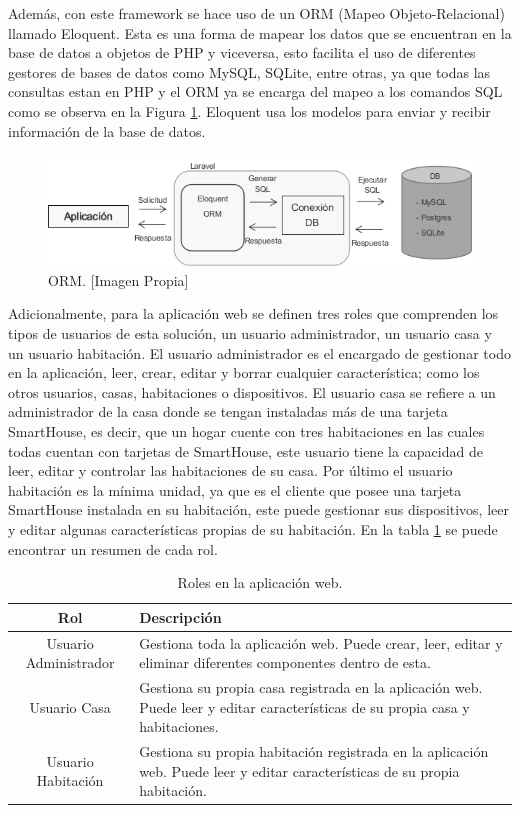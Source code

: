 Además, con este framework se hace uso de un ORM (Mapeo Objeto-Relacional) llamado Eloquent. Esta es una forma de mapear los datos que se encuentran en la base de datos a objetos de PHP y viceversa, esto facilita el uso de diferentes gestores de bases de datos como MySQL, SQLite, entre otras, ya que todas las consultas estan en PHP y el ORM ya se encarga del mapeo a los comandos SQL como se observa en la Figura \ref{fig:orm}. Eloquent usa los modelos para enviar y recibir información de la base de datos\cite{Eloq}.\\

\begin{figure}[H]
	\centering
	\caption[ORM]{ORM. [Imagen Propia]}
	\label{fig:orm}
	\includegraphics[width=0.7\linewidth]{Imagenes/ORM}
\end{figure}

Adicionalmente, para la aplicación web se definen tres roles que comprenden los tipos de usuarios de esta solución, un usuario administrador, un usuario casa y un usuario habitación. El usuario administrador es el encargado de gestionar todo en la aplicación, leer, crear, editar y borrar cualquier característica; como los otros usuarios, casas, habitaciones o dispositivos. El usuario casa se refiere a un administrador de la casa donde se tengan instaladas más de una tarjeta SmartHouse, es decir, que un hogar cuente con tres habitaciones en las cuales todas cuentan con tarjetas de SmartHouse, este usuario tiene la capacidad de leer, editar y controlar las habitaciones de su casa. Por último el usuario habitación es la mínima unidad, ya que es el cliente que posee una tarjeta SmartHouse instalada en su habitación, este puede gestionar sus dispositivos, leer y editar algunas características propias de su habitación. En la tabla \ref{table:roles} se puede encontrar un resumen de cada rol.\\

\begin{table}[H]
	\begin{center}
		\caption{Roles en la aplicación web.}
		\label{table:roles}
		\begin{tabular}{|c|p{8cm}|}
			\hline 
			\textbf{Rol} & \textbf{Descripción} \\ 
			\hline 
			Usuario Administrador & Gestiona toda la aplicación web. Puede crear, leer, editar y eliminar diferentes componentes dentro de esta.\\ 
			\hline 
			Usuario Casa & Gestiona su propia casa registrada en la aplicación web. Puede leer y editar características de su propia casa y habitaciones.\\ 
			\hline 
			Usuario Habitación & Gestiona su propia habitación registrada en la aplicación web. Puede leer y editar características de su propia habitación.\\ 
			\hline 
		\end{tabular} 
	\end{center}
\end{table}


